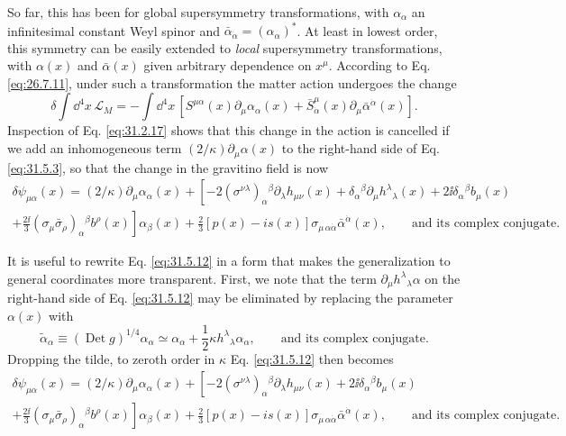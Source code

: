 So far, this has been for global supersymmetry transformations, with
\(\alpha_\alpha\) an infinitesimal constant Weyl spinor and
\(\bar\alpha_{\dot\alpha}=(\alpha_\alpha)^*\). At least in lowest order,
this symmetry can be easily extended to \emph{local} supersymmetry
transformations, with \(\alpha(x)\) and \(\bar\alpha(x)\) given arbitrary
dependence on \(x^\mu\). According to Eq. \eqref{eq:26.7.11}, under such
a transformation the matter action undergoes the change
\begin{equation}
  \delta\int \dd^4x\,\mathcal{L}_M
  =-\int \dd^4x\,
    \left[
      S^{\mu\alpha}(x)\partial_\mu\alpha_\alpha(x)
      +\bar S^\mu_{\dot\alpha}(x)
       \partial_\mu\bar\alpha^{\dot\alpha}(x)
    \right].
  \tag{31.5.11}\label{eq:31.5.11}
\end{equation}
Inspection of Eq. \eqref{eq:31.2.17} shows that this change in the action
is cancelled if we add an inhomogeneous term
\((2/\kappa)\partial_\mu\alpha(x)\) to the right-hand side of
Eq. \eqref{eq:31.5.3}, so that the change in the gravitino field is now
\begin{multline}
  \delta\psi_{\mu\alpha}(x)
  =(2/\kappa)\partial_\mu\alpha_\alpha(x)
  +\left[
      -2(\sigma^{\nu\lambda})_\alpha{}^\beta
        \partial_\lambda h_{\mu\nu}(x)
      +\delta_\alpha{}^\beta\partial_\mu h^\lambda{}_\lambda(x)
      +2\ii\delta_\alpha{}^\beta b_\mu(x)\right.\\
  \left.
      +\frac{2\ii}{3}
       (\sigma_\mu\bar\sigma_\rho)_\alpha{}^\beta b^\rho(x)
    \right]\alpha_\beta(x)
   +\frac{2}{3}[p(x)-is(x)]
      \sigma_{\mu\,\alpha\dot\alpha}\bar\alpha^{\dot\alpha}(x),
  \qquad\text{and its complex conjugate}.
  \tag{31.5.12}\label{eq:31.5.12}
\end{multline}

It is useful to rewrite Eq. \eqref{eq:31.5.12} in a form that makes the
generalization to general coordinates more transparent. First, we note
that the term \(\partial_\mu h^\lambda{}_\lambda\alpha\) on the
right-hand side of Eq. \eqref{eq:31.5.12} may be eliminated by replacing
the parameter \(\alpha(x)\) with
\begin{equation}
  \widetilde\alpha_\alpha
  \equiv(\operatorname{Det}g)^{1/4}\alpha_\alpha
  \simeq\alpha_\alpha
   +\frac{1}{2}\kappa h^\lambda{}_\lambda\alpha_\alpha,
  \qquad\text{and its complex conjugate}.
  \tag{31.5.13}\label{eq:31.5.13}
\end{equation}
Dropping the tilde, to zeroth order in \(\kappa\) Eq. \eqref{eq:31.5.12}
then becomes
\begin{multline}
  \delta\psi_{\mu\alpha}(x)
  =(2/\kappa)\partial_\mu\alpha_\alpha(x)
  +\left[
      -2(\sigma^{\nu\lambda})_\alpha{}^\beta
        \partial_\lambda h_{\mu\nu}(x)
      +2\ii\delta_\alpha{}^\beta b_\mu(x)\right.\\
  \left.
      +\frac{2\ii}{3}
       (\sigma_\mu\bar\sigma_\rho)_\alpha{}^\beta b^\rho(x)
    \right]\alpha_\beta(x)
   +\frac{2}{3}[p(x)-is(x)]
      \sigma_{\mu\,\alpha\dot\alpha}\bar\alpha^{\dot\alpha}(x),
  \qquad\text{and its complex conjugate}.
  \tag{31.5.14}\label{eq:31.5.14}
\end{multline}

